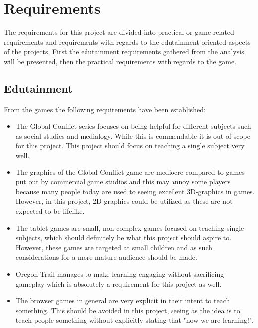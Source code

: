 \section{Requirements}\label{sec:requirements}
The requirements for this project are divided into practical or game-related requirements and requirements with regards to the edutainment-oriented aspects of the projects. First the edutainment requirements gathered from the analysis will be presented, then the practical requirements with regards to the game.

\subsection{Edutainment}
From the games the following requirements have been established: 
\begin{itemize}
\item The Global Conflict series focuses on being helpful for different subjects such as  social studies and medialogy. While this is commendable it is out of scope for this project. This project should focus on teaching a single subject very well. 

\item The graphics of the Global Conflict game are mediocre compared to games put out by commercial game studios and this may annoy some players because many people today are used to seeing excellent 3D-graphics in games. However, in this project, 2D-graphics could be utilized as these are not expected to be lifelike.

\item The tablet games are small, non-complex games focused on teaching single subjects, which should definitely be what this project should aspire to. However, these games are targeted at small children and as such considerations for a more mature audience should be made.

\item Oregon Trail manages to make learning engaging without sacrificing gameplay which is absolutely a requirement for this project as well.

\item The browser games in general are very explicit in their intent to teach something. This should be avoided in this project, seeing as the idea is to teach people something without explicitly stating that "now we are learning!". 
\end{itemize}

